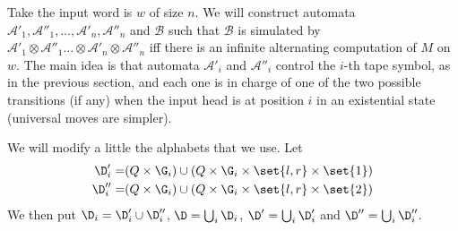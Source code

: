 \documentclass{LMCS}
\theoremstyle{plain}\newtheorem{remark}{Remark}
\theoremstyle{plain}\newtheorem{lemma}[thm]{Lemma}
\renewcommand{\Aa}{\mathcal{A}}
\renewcommand{\Bb}{\mathcal{B}}
\newcommand{\vAap}{\Aa'_1\otimes\Aa''_1\dots\otimes\Aa'_n\otimes\Aa''_n}
\begin{document}
Take the input word is $w$ of size $n$. We will construct
automata $\Aa'_1,\Aa''_1,\dots,\Aa'_n,\Aa''_n$ and $\Bb$ such that $\Bb$
is simulated by $\vAap$ iff there is an infinite alternating
computation of $M$ on $w$. The main idea is that automata $\Aa'_i$ and $\Aa''_i$ 
control the $i$-th tape symbol, as in the previous section, and each one is in charge 
of one of the two possible transitions (if any) when the input head is
at position $i$ in an existential state (universal moves are simpler).

We will modify a little the alphabets that we use. Let
\begin{align*}
  \D'_i=&(Q\times\G_i)\cup (Q\times\G_i\times\set{l,r}\times\set{1})\\
  \D''_i=&(Q\times\G_i)\cup (Q\times\G_i\times\set{l,r}\times\set{2})
\end{align*}
We then put $\D_i=\D'_i\cup\D''_i$, $\D=\bigcup_i \D_i$, 
$\D' = \bigcup_i \D'_i$ and $\D'' = \bigcup_i \D''_i$.
\end{document}
